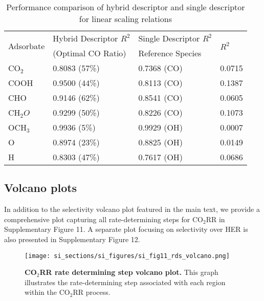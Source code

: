 \begin{table}[h]
  \centering
  {\fontsize{10}{12}\selectfont
  \begin{tabular}{*{4}{l}}
    \hline
    \multirow{2}{*}{Adsorbate} & Hybrid Descriptor $R^2$ & Single Descriptor $R^2$ & \multirow{2}{*}{$R^2$} \\
                               & (Optimal CO Ratio)      & Reference Species       &                        \\
    \hline
    CO$_2$    & 0.8083 (57\%)  & 0.7368 (CO)  & 0.0715 \\
    COOH      & 0.9500 (44\%)  & 0.8113 (CO)  & 0.1387 \\
    CHO       & 0.9146 (62\%)  & 0.8541 (CO)  & 0.0605 \\
    CH$_2O$   & 0.9299 (50\%)  & 0.8226 (CO)  & 0.1073 \\
    OCH$_3$   & 0.9936 (5\%)   & 0.9929 (OH)  & 0.0007 \\
    O         & 0.8974 (23\%)  & 0.8825 (OH)  & 0.0149 \\
    H         & 0.8303 (47\%)  & 0.7617 (OH)  & 0.0686 \\
    \hline
  \end{tabular}
  }
  \caption{Performance comparison of hybrid descriptor and single descriptor for linear scaling relations}
  \label{si_table14}
\end{table}


\subsection{Volcano plots}


In addition to the selectivity volcano plot featured in the main text, we provide a comprehensive plot capturing all rate-determining steps for CO$_2$RR in Supplementary Figure 11. A separate plot focusing on selectivity over HER is also presented in Supplementary Figure 12.


\begin{figure}
  \centering
  \texttt{[image: si\_sections/si\_figures/si\_fig11\_rds\_volcano.png]}
  \caption{\textbf{CO$_2$RR rate determining step volcano plot.}
  This graph illustrates the rate-determining step associated with each region within the CO$_2$RR process.}
  \label{si_fig11:rds_volcano}
\end{figure}


